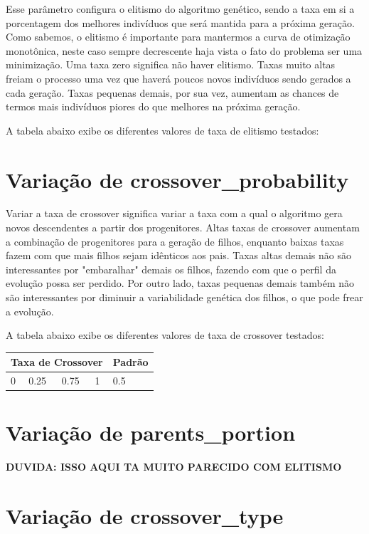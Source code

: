 \documentclass[12pt]{article}
\begin{document}
Esse parâmetro configura o elitismo do algoritmo genético, sendo a taxa em si a porcentagem dos melhores indivíduos que será mantida para a próxima geração. Como sabemos, o elitismo é importante para mantermos a curva de otimização monotônica, neste caso sempre decrescente haja vista o fato do problema ser uma minimização. Uma taxa zero significa não haver elitismo. Taxas muito altas freiam o processo uma vez que haverá poucos novos indivíduos sendo gerados a cada geração. Taxas pequenas demais, por sua vez, aumentam as chances de termos mais indivíduos piores do que melhores na próxima geração.

A tabela abaixo exibe os diferentes valores de taxa de elitismo testados:

\section{Variação de crossover\_probability}

Variar a taxa de crossover significa variar a taxa com a qual o algoritmo gera novos descendentes a partir dos progenitores. Altas taxas de crossover aumentam a combinação de progenitores para a geração de filhos, enquanto baixas taxas fazem com que mais filhos sejam idênticos aos pais. Taxas altas demais não são interessantes por "embaralhar" demais os filhos, fazendo com que o perfil da evolução possa ser perdido. Por outro lado, taxas pequenas demais também não são interessantes por diminuir a variabilidade genética dos filhos, o que pode frear a evolução.

A tabela abaixo exibe os diferentes valores de taxa de crossover testados:

\begin{table}[H]
	\centering
	\begin{tabular}{|l|l|l|l|l|}
		\hline
		\multicolumn{4}{|l|}{Taxa de Crossover} & Padrão \\ \hline
		0    & 0.25    & 0.75    & 1   &0.5 \\ \hline
	\end{tabular}
\end{table}

\section{Variação de parents\_portion}

\textbf{DUVIDA: ISSO AQUI TA MUITO PARECIDO COM ELITISMO}

\section{Variação de crossover\_type}
\end{document}
